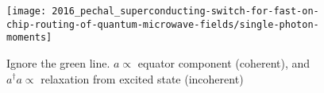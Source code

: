 \begin{figure}[h]
  \centering
  \texttt{[image: 2016\_pechal\_superconducting-switch-for-fast-on-chip-routing-of-quantum-microwave-fields/single-photon-moments]}
  \caption{\small Ignore  the green line.   $a \propto $ equator  component (coherent),
    and      $a^{\dagger}a     \propto      $     relaxation      from     excited      state
    (incoherent) \label{fig:single-photon-moments}}
\end{figure}

\noindent

